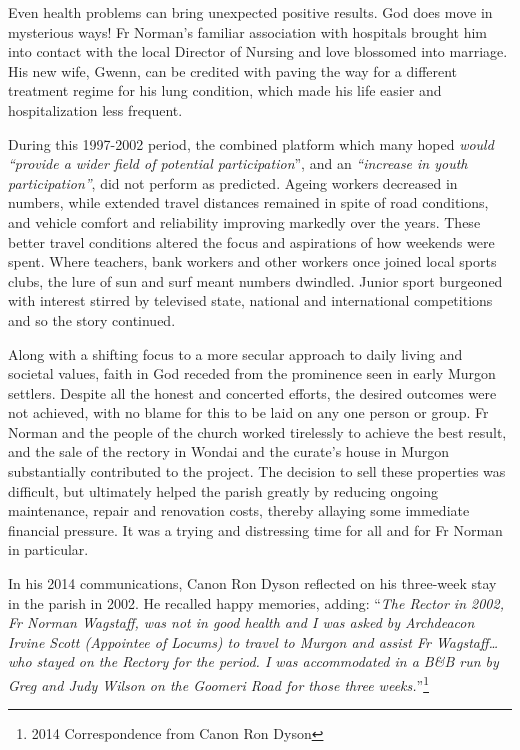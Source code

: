 Even health problems can bring unexpected positive results. God does move in mysterious ways! Fr Norman's familiar association with hospitals brought him into contact with the local Director of Nursing and love blossomed into marriage. His new wife, Gwenn, can be credited with paving the way for a different treatment regime for his lung condition, which made his life easier and hospitalization less frequent.



During this 1997-2002 period, the combined platform which many hoped \emph{would ``provide a wider field of potential participation}'', and an \emph{``increase in youth participation''}, did not perform as predicted. Ageing workers decreased in numbers, while extended travel distances remained in spite of road conditions, and vehicle comfort and reliability improving markedly over the years. These better travel conditions altered the focus and aspirations of how weekends were spent. Where teachers, bank workers and other workers once joined local sports clubs, the lure of sun and surf meant numbers dwindled. Junior sport burgeoned with interest stirred by televised state, national and international competitions and so the story continued.



Along with a shifting focus to a more secular approach to daily living and societal values, faith in God receded from the prominence seen in early Murgon settlers. Despite all the honest and concerted efforts, the desired outcomes were not achieved, with no blame for this to be laid on any one person or group. Fr Norman and the people of the church worked tirelessly to achieve the best result, and the sale of the rectory in Wondai and the curate's house in Murgon substantially contributed to the project. The decision to sell these properties was difficult, but ultimately helped the parish greatly by reducing ongoing maintenance, repair and renovation costs, thereby allaying some immediate financial pressure. It was a trying and distressing time for all and for Fr Norman in particular.



In his 2014 communications, Canon Ron Dyson reflected on his three-week stay in the parish in 2002. He recalled happy memories, adding: ``\emph{The Rector in 2002, Fr Norman Wagstaff, was not in good health and I was asked by Archdeacon Irvine Scott (Appointee of Locums) to travel to Murgon and assist Fr Wagstaff\ldots who stayed on the Rectory for the period. I was accommodated in a B\&B run by Greg and Judy Wilson on the Goomeri Road for those three weeks.}''\footnote{2014 Correspondence from Canon Ron Dyson}


